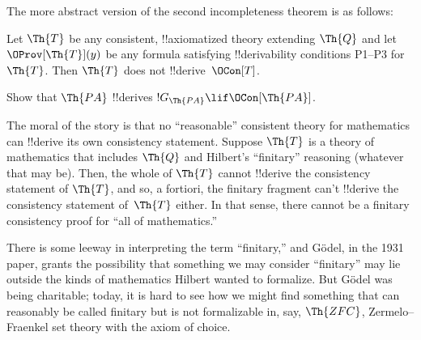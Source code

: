 \documentclass[../../../include/open-logic-section]{subfiles}
\begin{document}
The more abstract version of the second incompleteness theorem is as follows:

\begin{thm}
 Let $\Th{T}$ be any
consistent, !!{axiomatized} theory extending $\Th{Q}$ and let
$\OProv[\Th{T}](y)$ be any formula satisfying !!{derivability} conditions
P1--P3 for~$\Th{T}$. Then $\Th{T}$ does not !!{derive}~$\OCon[T]$.
\end{thm}

\begin{prob}
Show that $\Th{PA}$ !!{derive}s $!G_{\Th{PA}} \lif \OCon[\Th{PA}]$.
\end{prob}

\begin{digress}
The moral of the story is that no ``reasonable'' consistent theory for
mathematics can !!{derive} its own consistency statement. Suppose
$\Th{T}$ is a theory of mathematics that includes $\Th{Q}$ and
Hilbert's ``finitary'' reasoning (whatever that may be). Then, the
whole of $\Th{T}$ cannot !!{derive} the consistency statement of
$\Th{T}$, and so, a fortiori, the finitary fragment can't !!{derive}
the consistency statement of~$\Th{T}$ either. In that sense, there
cannot be a finitary consistency proof for ``all of mathematics.''

There is some leeway in interpreting the term ``finitary,'' and
G\"odel, in the 1931 paper, grants the possibility that something we
may consider ``finitary'' may lie outside the kinds of mathematics
Hilbert wanted to formalize. But G\"odel was being charitable; today,
it is hard to see how we might find something that can reasonably be
called finitary but is not formalizable in, say, $\Th{ZFC}$,
Zermelo--Fraenkel set theory with the axiom of choice.
\end{digress}
\end{document}
